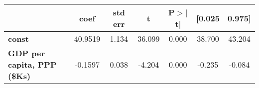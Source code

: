 \begin{center}
\begin{tabular}{lcccccc}
\toprule
                                    & \textbf{coef} & \textbf{std err} & \textbf{t} & \textbf{P$> |$t$|$} & \textbf{[0.025} & \textbf{0.975]}  \\
\midrule
\textbf{const}                      &      40.9519  &        1.134     &    36.099  &         0.000        &       38.700    &       43.204     \\
\textbf{GDP per capita, PPP (\$Ks)} &      -0.1597  &        0.038     &    -4.204  &         0.000        &       -0.235    &       -0.084     \\
\bottomrule
\end{tabular}
\end{center}